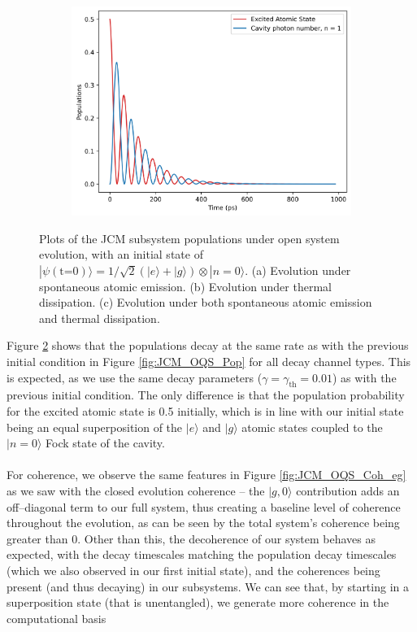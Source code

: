 \documentclass[11pt]{article}
\begin{document}
\begin{figure}[H]
    \vspace{0.5cm}
    
    \begin{subfigure}{0.45\textwidth}
        \centering
        \includegraphics[width=\linewidth]{Research Project/Code/results/JCM/OQS_Pop_Both_eg.png}
        \caption{}
        \label{fig:JCM_OQS_Pop_Both_eg}
    \end{subfigure}
    \hfill

    \caption{Plots of the JCM subsystem populations under open system evolution, with an initial state of $|\psi (\text{t=0})\rangle = 1/\sqrt{2}(|e\rangle + |g\rangle)\otimes|n=0\rangle$. (a) Evolution under spontaneous atomic emission. (b) Evolution under thermal dissipation. (c) Evolution under both spontaneous atomic emission and thermal dissipation.}
    \label{fig:JCM_OQS_Pop_eg}
\end{figure}

\noindent Figure \ref{fig:JCM_OQS_Pop_eg} shows that the populations decay at the same rate as with the previous initial condition in Figure \ref{fig:JCM_OQS_Pop} for all decay channel types. This is expected, as we use the same decay parameters ($\gamma= \gamma_{\scriptscriptstyle \text{th}} = 0.01$) as with the previous initial condition. The only difference is that the population probability for the excited atomic state is 0.5 initially, which is in line with our initial state being an equal superposition of the $|e\rangle$ and $|g\rangle$ atomic states coupled to the $|n=0\rangle$ Fock state of the cavity. \\
\\
For coherence, we observe the same features in Figure \ref{fig:JCM_OQS_Coh_eg} as we saw with the closed evolution coherence  -- the $|g,0\rangle$ contribution adds an off--diagonal term to our full system, thus creating a baseline level of coherence throughout the evolution, as can be seen by the total system's coherence being greater than 0. Other than this, the decoherence of our system behaves as expected, with the decay timescales matching the population decay timescales (which we also observed in our first initial state), and the coherences being present (and thus decaying) in our subsystems. We can see that, by starting in a superposition state (that is unentangled), we generate more coherence in the computational basis
\end{document}
